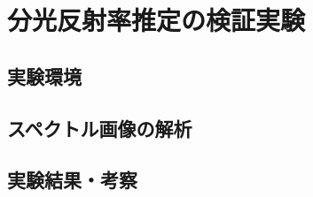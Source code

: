 \documentclass[../main]{subfiles}
\begin{document}
\graphicspath{{../figures/chap4/}}

\section{分光反射率推定の検証実験}
\label{sec:vexp_spectral-reflectance}

\subsection{実験環境}
\label{subsec:vexp_ref_environmet}

\subsection{スペクトル画像の解析}
\label{subsec:vexp_ref_analysis}

\subsection{実験結果・考察}
\label{subsec:vexp_ref_result}
\end{document}
